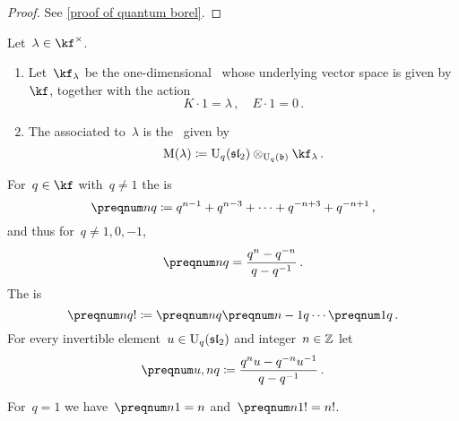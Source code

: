 \documentclass[a4paper, 11pt, oneside]{scrartcl}
\begin{document}
\begin{proof}
  See \cref{proof of quantum borel}.
\end{proof}

\begin{definition}
  Let~$\lambda \in \kf^\times$.
  \begin{enumerate}
    \item
      Let~$\kf_\lambda$ be the one-dimensional~ whose underlying vector space is given by~$\kf$, together with the action
      \[
        K \cdot 1 = \lambda \,,
        \quad
        E \cdot 1 = 0 \,.
      \]
    \item
      The  associated to~$\lambda$ is the~ given by
      \[
        \verma(\lambda)
        \defined
        \Univ_q(\sllie_2) \tensor_{\Univ_q(\blie)} \kf_\lambda \,.
      \]
  \end{enumerate}
\end{definition}

\begin{definition}
  \label{definition of quantum integers}
  For~$q \in \kf$ with~$q \neq 1$ the  is
  \[
    \qnum{n}
    \defined
    q^{n-1} + q^{n-3} + \dotsb + q^{-n+3} + q^{-n+1} \,,
  \]
  and thus for~$q \neq 1, 0, -1$,
  \[
    \qnum{n}
    =
    \frac{q^n - q^{-n}}{q - q^{-1}} \,.
  \]
  The  is
  \[
    \qnum{n}!
    \defined
    \qnum{n} \qnum{n-1} \dotsm \qnum{1} \,.
  \]
  For every invertible element~$u \in \operatorname{U}_q(\mathfrak{sl}_2)$ and integer~$n \in \mathbb{Z}$ let
  \[
    \qnum{u, n}
    \defined
    \frac{ q^n u - q^{-n} u^{-1} }{ q - q^{-1} } \,.
  \]
\end{definition}

\begin{remark}
  For~$q = 1$ we have~$\qnum{n}[1] = n$ and~$\qnum{n}[1]! = n!$.
\end{remark}
\end{document}
